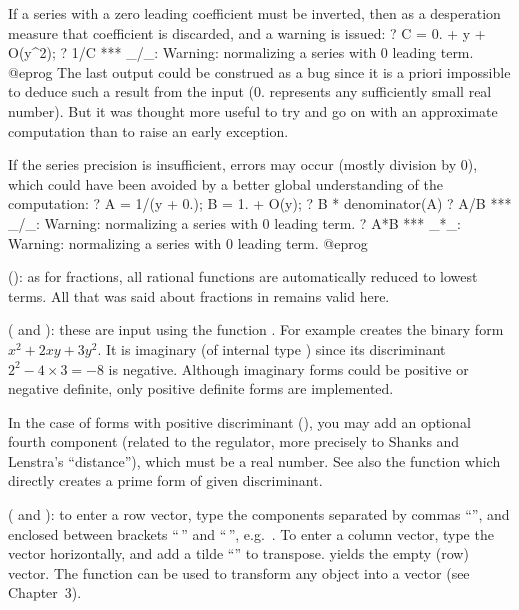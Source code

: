 If a series with a zero leading coefficient must be inverted, then as a
desperation measure that coefficient is discarded, and a warning is issued:
\bprog
? C = 0. + y + O(y^2);
? 1/C
  *** _/_: Warning: normalizing a series with 0 leading term.
@eprog\noindent
The last output could be construed as a bug since it is a priori impossible
to deduce such a result from the input ($0.$ represents any sufficiently
small real number). But it was thought more useful to try and go on with an
approximate computation than to raise an early exception.

If the series precision is insufficient, errors may occur (mostly division
by $0$), which could have been avoided by a better global understanding of
the computation:
\bprog
? A = 1/(y + 0.); B = 1. + O(y);
? B * denominator(A)
? A/B
  *** _/_: Warning: normalizing a series with 0 leading term.
? A*B
  *** _*_: Warning: normalizing a series with 0 leading term.
@eprog

(): as for fractions, all rational
functions are automatically reduced to lowest terms. All that was
said about fractions in  remains valid here.

%
( and ):
these are input using the function . For example 
creates the binary form $x^2+2xy+3y^2$. It is imaginary (of internal type
) since its discriminant $2^2 - 4\times 3 = -8$ is negative.
Although imaginary forms could be positive or negative definite, only
positive definite forms are implemented.

In the case of forms with positive discriminant (), you may add an
optional fourth component (related to the regulator, more precisely to Shanks
and Lenstra's ``distance''), which must be a real number. See also the
function  which directly creates a prime form of given
discriminant.

( and ): to enter a row vector, type the components
separated by commas ``\kbd{,}'', and enclosed between brackets
``\kbd{[}$\,$'' and ``$\,$\kbd{]}'', e.g.~\kbd{[1,2,3]}. To enter a column
vector, type the vector horizontally, and add a tilde ``\til'' to transpose.
\kbd{[ ]} yields the empty (row) vector. The function  can be used
to transform any object into a vector (see Chapter~3).

